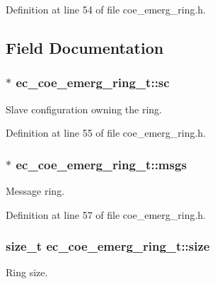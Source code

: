Definition at line 54 of file coe\-\_\-emerg\-\_\-ring.\-h.



\subsection{Field Documentation}
\subsubsection[{sc}]{$\ast$ ec\-\_\-coe\-\_\-emerg\-\_\-ring\-\_\-t\-::sc}\label{structec__coe__emerg__ring__t_a797c7475bf92dd29e31802e6501a8c47}


Slave configuration owning the ring. 



Definition at line 55 of file coe\-\_\-emerg\-\_\-ring.\-h.

\subsubsection[{msgs}]{$\ast$ ec\-\_\-coe\-\_\-emerg\-\_\-ring\-\_\-t\-::msgs}\label{structec__coe__emerg__ring__t_af505c9c347ce9a49448a36252dde0f45}


Message ring. 



Definition at line 57 of file coe\-\_\-emerg\-\_\-ring.\-h.

\subsubsection[{size}]{\setlength{\rightskip}{0pt plus 5cm}size\-\_\-t ec\-\_\-coe\-\_\-emerg\-\_\-ring\-\_\-t\-::size}\label{structec__coe__emerg__ring__t_a26777c2390fb1a329e0866f7954c447b}


Ring size. 



